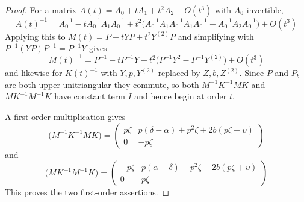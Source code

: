 \documentclass{article}
\theoremstyle{plain}
\theoremstyle{definition}
\theoremstyle{plain}
\theoremstyle{plain}
\theoremstyle{plain}
\theoremstyle{remark}
\theoremstyle{remark}
\theoremstyle{plain}
\theoremstyle{plain}
\theoremstyle{plain}
\theoremstyle{plain}
\begin{document}
\begin{proof}
For a matrix $A(t) = A_0 + tA_1 + t^2A_2 + O(t^3)$ with $A_0$ invertible,
\begin{equation*}
	A(t)^{-1} = A_0^{-1} - tA_0^{-1}A_1A_0^{-1} + t^2\bigl(A_0^{-1}A_1A_0^{-1}A_1A_0^{-1} - A_0^{-1}A_2A_0^{-1}\bigr) + O(t^3)
\end{equation*}
Applying this to $M(t) = P + tYP + t^2Y^{(2)}P$ and simplifying with $P^{-1}(YP)P^{-1} = P^{-1}Y$ gives
\begin{equation*}
	M(t)^{-1} = P^{-1} - tP^{-1}Y + t^2\bigl(P^{-1}Y^2 - P^{-1}Y^{(2)}\bigr) + O(t^3)
\end{equation*}
and likewise for $K(t)^{-1}$ with $Y, p, Y^{(2)}$ replaced by $Z, b, Z^{(2)}$. Since $P$ and $P_b$ are both upper unitriangular they commute, so both $M^{-1}K^{-1}MK$ and $MK^{-1}M^{-1}K$ have constant term $I$ and hence begin at order $t$.
	
\medskip
	
A first-order multiplication gives
\begin{equation*}
	[t]\bigl(M^{-1}K^{-1}MK\bigr) = \begin{pmatrix}p\zeta & p(\delta-\alpha)+p^2\zeta+2b(p\zeta+\upsilon)\\ 0&-p\zeta \end{pmatrix}
\end{equation*}
and
\begin{equation*}
	[t]\bigl(MK^{-1}M^{-1}K\bigr) = \begin{pmatrix} -p\zeta & p(\alpha-\delta)+p^2\zeta-2b(p\zeta+\upsilon)\\ 0&p\zeta \end{pmatrix}
\end{equation*}
This proves the two first-order assertions.

\medskip


\end{proof}
\end{document}
